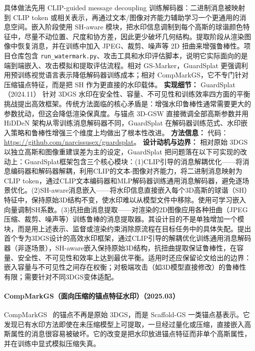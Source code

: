 具体做法先用 CLIP-guided message decoupling 训练解码器：二进制消息被映射到 CLIP token 或相关表示，再通过文本/图像对齐能力辅助学习一个更通用的消息空间。嵌入阶段使用 SH-aware 模块，把水印信息调制到每个高斯的球谐颜色特征中，尽量不动位置、尺度和协方差，因此更少破坏几何结构。提取阶段从渲染图像中恢复消息，并在训练中加入 JPEG、裁剪、噪声等 2D 扭曲来增强鲁棒性。项目仓库包含 \texttt{run\_watermark.py}、攻击工具和水印评估脚本，说明它实际面向的是端到端嵌入、攻击模拟和提取评估流程。相对 GS-Marker，GuardSplat 更强调利用预训练视觉语言表示降低解码器训练成本；相对 CompMarkGS，它不专门针对压缩锚点特征，而是把 SH 作为更直接的水印载体。
\textbf{实现细节：} GuardSplat（2024.11） 针对 3DGS 水印在安全性、容量、不可见性和训练效率四方面的平衡挑战提出高效框架。传统方法面临的核心矛盾是：增强水印鲁棒性通常需要更大的参数扰动，但这会降低渲染保真度。与锚点 3D-GSW 直接微调全部高斯参数并用 HiDDeN 架构从零训练消息解码器不同，GuardSplat 在解码器训练范式、水印嵌入策略和鲁棒性增强三个维度上均做出了根本性改进。
\textbf{方法信息：} 代码：\url{https://github.com/narcissusex/guardsplat}。
\textbf{设计动机与边界：} 相对原始 3DGS 以独立高斯和图像重建误差为主的设定，GuardSplat 把问题落在以下可实现的改动上：GuardSplat框架包含三个核心模块：(1)CLIP引导的消息解耦优化——将消息编码器和解码器解耦，利用CLIP的文本-图像对齐能力，将二进制消息映射为CLIP token，通过CLIP文本编码器和MLP解码器训练通用消息解码器，避免逐场景优化。(2)SH-aware消息嵌入——将水印信息直接嵌入每个3D高斯的球谐（SH）特征中，保持原始3D结构不变，使水印难以从模型文件中移除。使用可学习嵌入向量调制SH系数。(3)抗扭曲消息提取——对渲染的2D图像应用各种扭曲（JPEG压缩、裁剪、噪声等）训练鲁棒的消息提取器。其设计目的不是单独增加一个模块，而是用上述表示、监督或渲染约束消除原流程在目标任务中的具体失配。提出首个专为3DGS设计的高效水印框架，通过CLIP引导的解耦优化训练通用消息解码器（非逐场景），SH-aware嵌入保持原始3D结构，抗扭曲提取保证鲁棒性，在容量、安全性、不可见性和效率上达到最优平衡。适用时还应保留论文给出的边界：嵌入容量与不可见性之间存在权衡；对极端攻击（如3D模型直接修改）的鲁棒性有限；需要针对不同3DGS变体适配。
\paragraph{CompMarkGS（面向压缩的锚点特征水印）（2025.03）}
CompMarkGS~\cite{2503_12836} 的锚点不再是原始 3DGS，而是 Scaffold-GS 一类锚点基表示。它发现已有水印方法即使在未压缩模型上可提取，一旦经过量化或压缩，直接嵌入高斯属性的消息很容易被破坏。它的改变是把水印放进锚点特征而非单个高斯属性，并在训练中显式模拟压缩失真。

